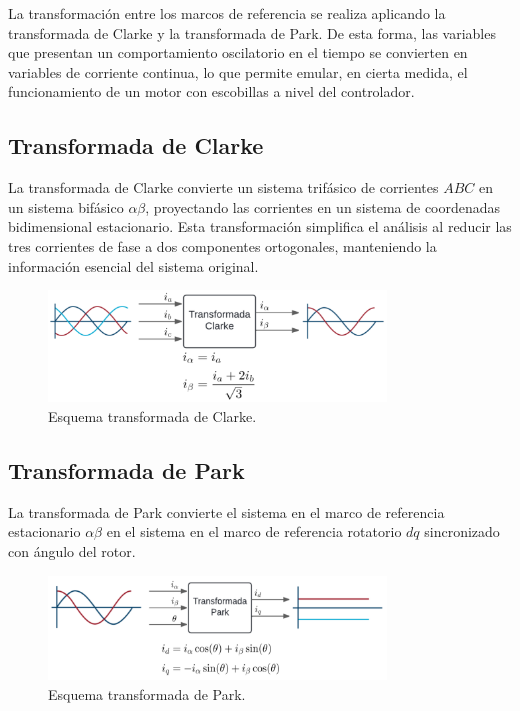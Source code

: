 \documentclass[11pt]{report}
\begin{document}
La transformación entre los marcos de referencia se realiza aplicando la transformada de Clarke y la transformada de Park. De esta forma, las variables que presentan un comportamiento oscilatorio en el tiempo se convierten en variables de corriente continua, lo que permite emular, en cierta medida, el funcionamiento de un motor con escobillas a nivel del controlador. \cite{power_conv_14}

\subsection{Transformada de Clarke}
La transformada de Clarke convierte un sistema trifásico de corrientes \(ABC\) en un sistema bifásico \(\alpha\beta\), proyectando las corrientes en un sistema de coordenadas bidimensional estacionario. Esta transformación simplifica el análisis al reducir las tres corrientes de fase a dos componentes ortogonales, manteniendo la información esencial del sistema original. \cite{AN1078}


\begin{figure}[ht]
	\centering
	\includegraphics[width=0.8\textwidth]{imagenes/Diagramas/clarke.png}
	\caption{Esquema transformada de Clarke.}
	\label{fig:clarke_transform}
\end{figure}
\FloatBarrier

\newpage
\subsection{Transformada de Park}
La transformada de Park convierte el sistema en el marco de referencia estacionario \(\alpha\beta\) en el sistema en el marco de referencia rotatorio \(dq\) sincronizado con ángulo del rotor. \cite{AN1078}

\begin{figure}[ht]
	\centering
	\includegraphics[width=0.8\textwidth]{imagenes/Diagramas/park.png}
	\caption{Esquema transformada de Park.}
\end{figure}
\FloatBarrier
\end{document}
